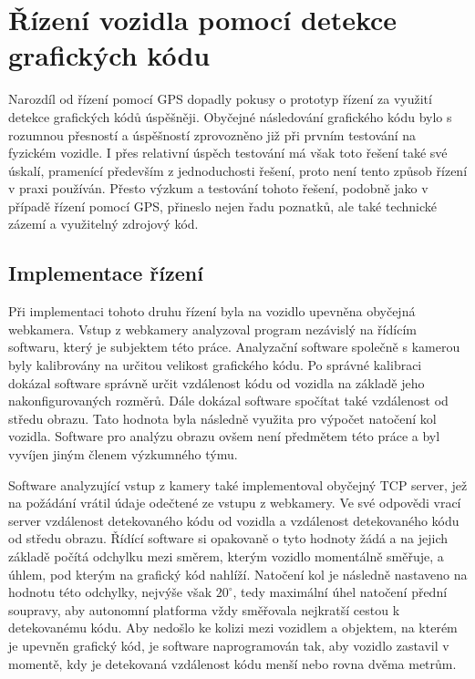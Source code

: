 \documentclass[czech, bachelor]{diploma}
\begin{document}
\section{Řízení vozidla pomocí detekce grafických kódu}

Narozdíl od řízení pomocí GPS dopadly pokusy o prototyp řízení za využití detekce grafických kódů úspěšněji. Obyčejné následování
grafického kódu bylo s rozumnou přesností a úspěšností zprovozněno již při prvním testování na fyzickém vozidle. I přes relativní
úspěch testování má však toto řešení také své úskalí, pramenící především z jednoduchosti řešení, proto není tento způsob řízení
v praxi používán. Přesto výzkum a testování tohoto řešení, podobně jako v případě řízení pomocí GPS, přineslo nejen řadu poznatků,
ale také technické zázemí a využitelný zdrojový kód.

\subsection{Implementace řízení}

Při implementaci tohoto druhu řízení byla na vozidlo upevněna obyčejná webkamera. Vstup z webkamery analyzoval program nezávislý
na řídícím softwaru, který je subjektem této práce. Analyzační software společně s kamerou byly kalibrovány na určitou velikost
grafického kódu. Po správné kalibraci dokázal software správně určit vzdálenost kódu od vozidla na základě jeho nakonfigurovaných
rozměrů. Dále dokázal software spočítat také vzdálenost od středu obrazu. Tato hodnota byla následně využita pro výpočet natočení
kol vozidla. Software pro analýzu obrazu ovšem není předmětem této práce a byl vyvíjen jiným členem výzkumného týmu.

Software analyzující vstup z kamery také implementoval obyčejný TCP server, jež na požádání vrátil údaje odečtené ze vstupu
z webkamery. Ve své odpovědi vrací server vzdálenost detekovaného kódu od vozidla a vzdálenost detekovaného kódu od středu obrazu.
Řídící software si opakovaně o tyto hodnoty žádá a na jejich základě počítá odchylku mezi směrem, kterým vozidlo momentálně
směřuje, a úhlem, pod kterým na grafický kód nahlíží. Natočení kol je následně nastaveno na hodnotu této odchylky, nejvýše však
$20^{\circ}$, tedy maximální úhel natočení přední soupravy, aby autonomní platforma vždy směřovala nejkratší cestou k detekovanému
kódu. Aby nedošlo ke kolizi mezi vozidlem a objektem, na kterém je upevněn grafický kód, je software naprogramován tak, aby
vozidlo zastavil v momentě, kdy je detekovaná vzdálenost kódu menší nebo rovna dvěma metrům.
\end{document}
